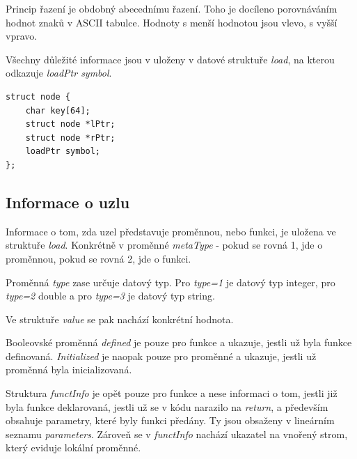 \documentclass[11pt, a4paper]{article}
\begin{document}
Princip řazení je obdobný abecednímu řazení. Toho je docíleno porovnáváním hodnot znaků v ASCII tabulce. Hodnoty s menší hodnotou jsou vlevo, s vyšší vpravo.

Všechny důležité informace jsou v uloženy v datové struktuře \textit{load}, na kterou odkazuje \textit{loadPtr symbol}.

\begin{verbatim}
struct node {
    char key[64];
    struct node *lPtr;
    struct node *rPtr;
    loadPtr symbol;
};
\end{verbatim}


\subsection{Informace o uzlu}
Informace o tom, zda uzel představuje proměnnou, nebo funkci, je uložena ve struktuře \textit{load}. Konkrétně v proměnné \textit{metaType} - pokud se rovná 1, jde o proměnnou, pokud se rovná 2, jde o funkci.

Proměnná \textit{type} zase určuje datový typ. Pro \textit{type=1} je datový typ integer, pro \textit{type=2} double a pro \textit{type=3} je datový typ string.

Ve struktuře \textit{value} se pak nachází konkrétní hodnota.

Booleovské proměnná \textit{defined} je pouze pro funkce a ukazuje, jestli už byla funkce definovaná. \textit{Initialized} je naopak pouze pro proměnné a ukazuje, jestli už proměnná byla inicializovaná.

Struktura \textit{functInfo} je opět pouze pro funkce a nese informaci o tom, jestli již byla funkce deklarovaná, jestli už se v kódu narazilo na \textit{return}, a především obsahuje parametry, které byly funkci předány. Ty jsou obsaženy v lineárním seznamu \textit{parameters}. Zároveň se v \textit{functInfo} nachází ukazatel na vnořený strom, který eviduje lokální proměnné.


\begin{Parallel}[v]{0.48\textwidth}{0.48\textwidth}
\ParallelPar
\end{Parallel}
\end{document}
